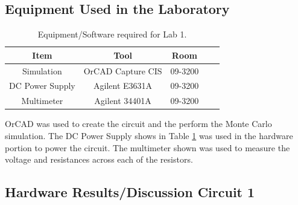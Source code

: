 \documentclass[11pt]{article}
\begin{document}
\pagebreak

\subsection{Equipment Used in the Laboratory}

\begin{table}[htbp]
	\setlength{\tabcolsep}{14pt}
	\centering
	\caption{Equipment/Software required for Lab 1.}
	\label{Table:Equipment}
	\begin{tabular}{|c||c|c|c|c|}
		\hline
		Item & Tool & Room      \\
		\hline
		Simulation & OrCAD Capture CIS & 09-3200   \\
		\hline  
		DC Power Supply & Agilent E3631A   & 09-3200 \\ 
		\hline 
		Multimeter & Agilent 34401A & 09-3200 \\
		\hline
	\end{tabular}
\end{table}

OrCAD was used to create the circuit and the perform the Monte Carlo simulation. The DC Power Supply shows in Table \ref{Table:Equipment} was used in the hardware portion to power the circuit. The multimeter shown was used to measure the voltage and resistances across each of the resistors.

\subsection{Hardware Results/Discussion Circuit 1}	
\end{document}
